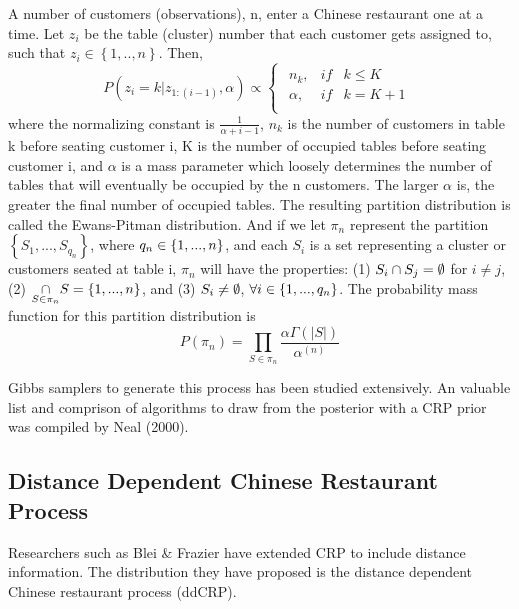 \noindent
A number of customers (observations), n, enter a Chinese restaurant one at a
time. Let $z_i$ be the table (cluster) number that each customer gets assigned
to, such that $z_i \in \left\{ 1,..,n \right\}$. Then,
\begin{equation}
  P(z_i=k|z_{1:(i-1)},\alpha) \propto 
  \begin{cases}
    \begin{array}{rll}
      n_k,    & if & k \le K\\
      \alpha, & if & k = K+1\\
    \end{array}
  \end{cases}
\end{equation}
where the normalizing constant is $\frac{1}{\alpha+i-1}$, $n_k$ is the number
of customers in table k before seating customer i, K is the number of occupied 
tables before seating customer i, and $\alpha$ is a mass parameter which 
loosely determines the number of tables that will eventually be occupied by 
the n customers. The larger $\alpha$ is, the greater the final number of 
occupied tables. The resulting partition distribution is called the 
Ewans-Pitman distribution. And if we let $\pi_n$ represent the partition
$\left\{S_1,...,S_{q_n}\right\}$, where $q_n \in \left \{1,...,n\right \}$, and each
$S_i$ is a set representing a cluster or customers seated at table i, $\pi_n$
will have the properties: (1) $S_i \cap S_j = \emptyset$ for $i \ne j$, 
(2) $\underset{S \in \pi_n}{\cap} S = \left \{ 1,...,n \right \}$, and (3) $S_i \ne \emptyset$, 
$\forall i \in \left \{ 1,...,q_n\right \}$. The probability mass function for this 
partition distribution is
\begin{equation}
  P(\pi_n) = \underset{S \in \pi_n}{\prod} 
             \frac{\alpha\Gamma(|S|)}{\alpha^{(n)}}
\end{equation}

\noindent
Gibbs samplers to generate this process has been studied extensively. 
An valuable list and comprison of algorithms to draw from the posterior with 
a CRP prior was compiled by Neal (2000).

\subsection{Distance Dependent Chinese Restaurant Process}
Researchers such as Blei \& Frazier have extended CRP to include 
distance information. The distribution they have proposed is the distance
dependent Chinese restaurant process (ddCRP). \\

